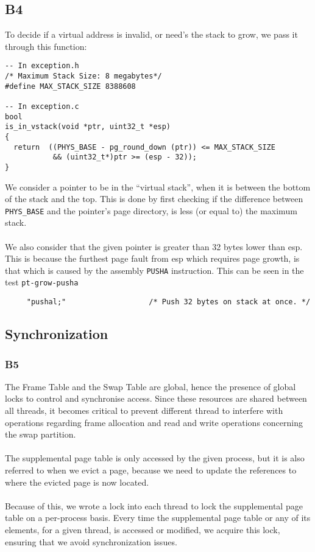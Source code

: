 \documentclass[a4wide, 11pt]{article}
\newcommand{\tx}{\texttt}
\begin{document}
\subsection{B4}

To decide if a virtual address is invalid, or need's the stack to grow, we pass it through this function:
\begin{verbatim}
-- In exception.h
/* Maximum Stack Size: 8 megabytes*/
#define MAX_STACK_SIZE 8388608

-- In exception.c
bool
is_in_vstack(void *ptr, uint32_t *esp)
{
  return  ((PHYS_BASE - pg_round_down (ptr)) <= MAX_STACK_SIZE
           && (uint32_t*)ptr >= (esp - 32));
}
\end{verbatim}

We consider a pointer to be in the ``virtual stack'', when it is between the bottom of the stack and the top. This is done by first checking if the difference between \tx{PHYS\_BASE} and the pointer's page directory, is less (or equal to) the maximum stack.\\
\\
We also consider that the given pointer is greater than 32 bytes lower than esp. This is because the furthest page fault from esp which requires page growth, is that which is caused by the assembly \tx{PUSHA} instruction. This can be seen in the test \tx{pt-grow-pusha}

\begin{verbatim}
     "pushal;"                   /* Push 32 bytes on stack at once. */
\end{verbatim}

\subsection{Synchronization}
\subsubsection{B5}

The Frame Table and the Swap Table are global, hence the presence of global locks to control and synchronise access. Since these resources are shared between all threads, it becomes critical to prevent different thread to interfere with operations regarding frame allocation and read and write operations concerning the swap partition.\\
\\
The supplemental page table is only accessed by the given process, but it is also referred to when we evict a page, because we need to update the references to where the evicted page is now located.\\
\\
Because of this, we wrote a lock into each thread to lock the supplemental page table on a per-process basis. Every time the supplemental page table or any of its elements, for a given thread, is accessed or modified, we acquire this lock, ensuring that we avoid synchronization issues.
\end{document}
